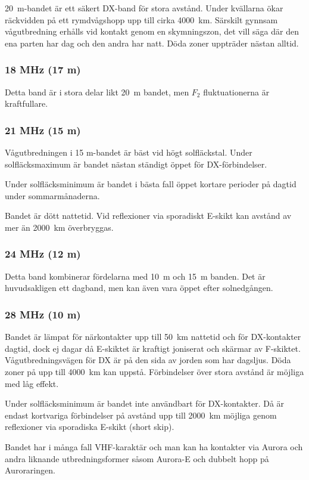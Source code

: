 20~m-bandet är ett säkert DX-band för stora avstånd.
Under kvällarna ökar räckvidden på ett rymdvågshopp upp till cirka 4000~km.
Särskilt gynnsam vågutbredning erhålls vid kontakt genom en skymningszon, det
vill säga där den ena parten har dag och den andra har natt.
Döda zoner uppträder nästan alltid.

\subsubsection{18 MHz (17 m)}

Detta band är i stora delar likt 20~m bandet, men \(F_2\) fluktuationerna
är kraftfullare.

\subsubsection{21 MHz (15 m)}

Vågutbredningen i 15 m-bandet är bäst vid högt solfläckstal.
Under solfläcksmaximum är bandet nästan ständigt öppet för DX-förbindelser.

Under solfläcksminimum är bandet i bästa fall öppet kortare perioder
på dagtid under sommarmånaderna.

Bandet är dött nattetid. Vid reflexioner via sporadiskt E-skikt kan
avstånd av mer än 2000~km överbryggas.

\subsubsection{24 MHz (12 m)}

Detta band kombinerar fördelarna med 10~m och 15~m banden.
Det är huvudsakligen ett dagband, men kan även vara öppet efter
solnedgången.

\subsubsection{28 MHz (10 m)}

Bandet är lämpat för närkontakter upp till 50~km nattetid och för DX-kontakter
dagtid, dock ej dagar då E-skiktet är kraftigt joniserat och skärmar av
F-skiktet.
Vågutbredningsvägen för DX är på den sida av jorden som har dagsljus.
Döda zoner på upp till 4000~km kan uppstå.
Förbindelser över stora avstånd är möjliga med låg effekt.

Under solfläcksminimum är bandet inte användbart för DX-kontakter.
Då är endast kortvariga förbindelser på avstånd upp till 2000~km möjliga
genom reflexioner via sporadiska E-skikt (short skip).

Bandet har i många fall VHF-karaktär och man kan ha kontakter via Aurora och
andra liknande utbredningsformer såsom Aurora-E och dubbelt hopp på
Auroraringen.
